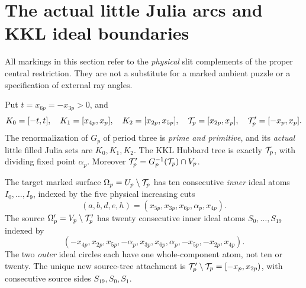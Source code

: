 \section{The actual little Julia arcs and KKL ideal boundaries}
\label{sec:marking}
All markings in this section refer to the \emph{physical}
slit complements of the proper central restriction.
They are not a substitute for a marked ambient puzzle
or a specification of external ray angles.

\begin{theorem}
\label{thm:marking}
Put $t=x_{6p}=-x_{3p}>0$, and
\begin{equation}\label{eq:tree}
 K_0=[-t,t],\quad K_1=[x_{4p},x_p],\quad
 K_2=[x_{2p},x_{5p}],\quad
 \mathcal T_p=[x_{2p},x_p],\quad
 \mathcal T'_p=[-x_p,x_p].
\end{equation}
The renormalization of $G_p$ of period three is
\emph{prime and primitive}, and its \emph{actual}
little filled Julia sets are $K_0,K_1,K_2$.
The KKL Hubbard tree is exactly $\mathcal T_p$, with
dividing fixed point $\alpha_p$.
Moreover $\mathcal T'_p=G_p^{-1}(\mathcal T_p)\cap V_p$.

The target marked surface $\Omega_p=U_p\setminus\mathcal T_p$
has ten consecutive \emph{inner} ideal atoms
$I_0,\ldots,I_9$, indexed by the five physical
increasing cuts
\[
 (a,b,d,e,h)=(x_{5p},x_{3p},x_{6p},\alpha_p,x_{4p}).
\]
The source $\Omega'_p=V_p\setminus\mathcal T'_p$
has twenty consecutive inner ideal atoms
$S_0,\ldots,S_{19}$ indexed by
\[
 (-x_{4p},x_{2p},x_{5p},-\alpha_p,x_{3p},
 x_{6p},\alpha_p,-x_{5p},-x_{2p},x_{4p}).
\]
The two \emph{outer} ideal circles each have one
whole-component atom, not ten or twenty.
The unique new source-tree attachment is
$\mathcal T'_p\setminus\mathcal T_p=[-x_p,x_{2p})$, with
consecutive source sides $S_{19},S_0,S_1$.
\end{theorem}

